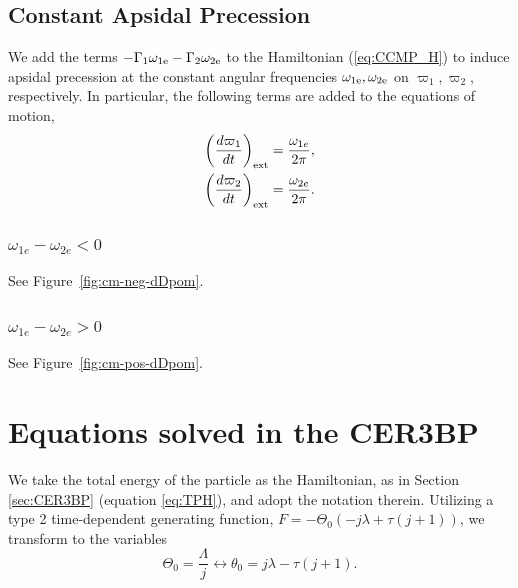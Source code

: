 \documentclass[usenatbib,twocolumn]{mnras}
\begin{document}
\subsection{Constant Apsidal Precession}
We add the terms $-\Gamma_1\omega_{1\rm e}-\Gamma_2\omega_{2\rm e}$ to the Hamiltonian (\ref{eq:CCMP_H}) to induce apsidal precession at the constant angular frequencies $\omega_{1\rm e},\omega_{2\rm e}$ on $\varpi_1,\varpi_2$, respectively. In particular, the following terms are added to the equations of motion,
\begin{align}
    \left(\frac{d\varpi_1 }{dt}\right)_{\rm ext} = \frac{\omega_{1e}}{2\pi}, \\
    \left(\frac{d\varpi_2 }{dt}\right)_{\rm ext} = \frac{\omega_{2e}}{2\pi}.
\end{align}

\subsubsection{$\omega_{1e}-\omega_{2e}<0$}
See Figure~\ref{fig:cm-neg-dDpom}.

\subsubsection{$\omega_{1e}-\omega_{2e}>0$}
See Figure~\ref{fig:cm-pos-dDpom}.








\clearpage


\clearpage
\onecolumn
\appendix
\section{Equations solved in the CER3BP}
We take the total energy of the particle as the Hamiltonian, as in Section \ref{sec:CER3BP} (equation \ref{eq:TPH}), and adopt the notation therein.
Utilizing a type 2 time-dependent generating function, $F=- \Theta_{0} \left(- j \lambda + \tau \left(j + 1\right)\right)$, we transform to the variables
\begin{equation}
    \Theta_{0} = \frac{\Lambda}{j} \longleftrightarrow
    \theta_0 = j \lambda - \tau \left(j + 1\right).
\end{equation}
\end{document}
